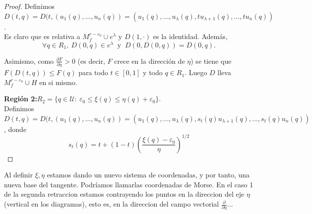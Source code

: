 \begin{proof}
    Definimos $D(t,q)=D(t,(u_1(q),\dots,u_n(q))=(u_1(q),\dots,u_{\lambda}(q),tu_{\lambda+1}(q),\dots,tu_n(q))$.\\
    
    Es claro que es relativa a $M^{c-\varepsilon_0}_f\cup e^{\lambda}$ y   $D(1,\cdot)$ es la identidad. Además,
    \begin{equation*}
        \forall q\in R_1, ~D(0, q)\in e^{\lambda} ~\text{ y }~ D(0,D(0,q))=D(0,q).
    \end{equation*} 

    Asimismo, como $\frac{\partial F}{\partial \eta}>0$ (es decir, $F$ crece en la dirección de $\eta$) se tiene que $F(D(t,q))\le F(q)$ para todo $t\in [0,1]$ y todo $q\in R_1$. Luego $D$ lleva $M_f^{c-\varepsilon_0}\cup H$ en si mismo.


    \textbf{Región 2:}\quad $R_2=\{q\in \mathcal{U}:~ \varepsilon_0\le \xi(q)\le \eta(q)+\varepsilon_0\}$.\\

    Definimos $D(t,q)=D(t,(u_1(q),\dots,u_n(q))=(u_1(q),\dots,u_{\lambda}(q),s_t(q) u_{\lambda+1}(q),\dots,s_t(q) u_n(q))$, donde 
    \begin{equation*}
        s_t(q)=t + (1-t)\left(\frac{\xi(q)-\varepsilon_0}{\eta}\right)^{1/2}
    \end{equation*}

    

    
    

    

    
\end{proof}

{\color{blue} Al definir $\xi,\eta$ estamos dando un nuevo sistema de coordenadas, y por tanto, una nueva base del tangente. Podríamos llamarlas coordenadas de Morse. En el caso 1 de la segunda retraccion estamos contrayendo los puntos en la direccion del eje $\eta$ (vertical en los diagramas), esto es, en la direccion del campo vectorial $\frac{\partial}{\partial\eta}$...}
    